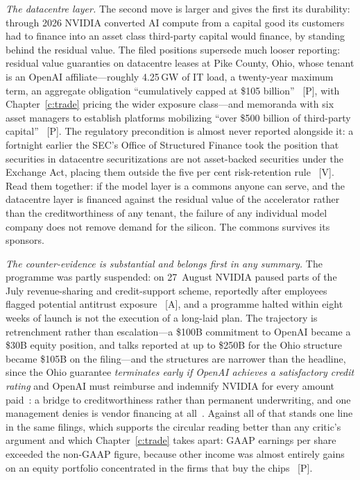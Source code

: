 \emph{The datacentre layer.} The second move is larger and gives the first its durability: through 2026 NVIDIA converted AI compute from a capital good its customers had to finance into an asset class third-party capital would finance, by standing behind the residual value. The filed positions supersede much looser reporting: residual value guaranties on datacentre leases at Pike County, Ohio, whose tenant is an OpenAI affiliate---roughly 4.25\,GW of IT load, a twenty-year maximum term, an aggregate obligation ``cumulatively capped at \$105 billion''~\cite{nvda-ohio} [P], with Chapter~\ref{c:trade} pricing the wider exposure class---and memoranda with six asset managers to establish platforms mobilizing ``over \$500 billion of third-party capital''~\cite{nvda-500b} [P]. The regulatory precondition is almost never reported alongside it: a fortnight earlier the SEC's Office of Structured Finance took the position that securities in datacentre securitizations are not asset-backed securities under the Exchange Act, placing them outside the five per cent risk-retention rule~\cite{sec-dcs} [V]. Read them together: if the model layer is a commons anyone can serve, and the datacentre layer is financed against the residual value of the accelerator rather than the creditworthiness of any tenant, the failure of any individual model company does not remove demand for the silicon. The commons survives its sponsors.

\emph{The counter-evidence is substantial and belongs first in any summary.} The programme was partly suspended: on 27~August NVIDIA paused parts of the July revenue-sharing and credit-support scheme, reportedly after employees flagged potential antitrust exposure~\cite{nvda-pause} [A], and a programme halted within eight weeks of launch is not the execution of a long-laid plan. The trajectory is retrenchment rather than escalation---a \$100B commitment to OpenAI became a \$30B equity position, and talks reported at up to \$250B for the Ohio structure became \$105B on the filing---and the structures are narrower than the headline, since the Ohio guarantee \emph{terminates early if OpenAI achieves a satisfactory credit rating} and OpenAI must reimburse and indemnify NVIDIA for every amount paid~\cite{nvda-ohio}: a bridge to creditworthiness rather than permanent underwriting, and one management denies is vendor financing at all~\cite{nvda-critique}. Against all of that stands one line in the same filings, which supports the circular reading better than any critic's argument and which Chapter~\ref{c:trade} takes apart: GAAP earnings per share exceeded the non-GAAP figure, because other income was almost entirely gains on an equity portfolio concentrated in the firms that buy the chips~\cite{nvda-q2fy27} [P].

